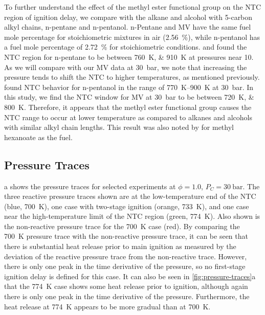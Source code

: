 \documentclass[letterpaper, review, sort&compress]{elsarticle}
\providecommand{\DIFadd}[1]{{\protect\color{blue}\uwave{#1}}} %
\providecommand{\DIFaddbegin}{} %
\providecommand{\DIFaddend}{} %
\newcommand{\DIFaddincludegraphics}[2][]{{\color{blue}\fbox{\DIFOincludegraphics[#1]{#2}}}} %
\DeclareRobustCommand{\DIFaddbegin}{\DIFOaddbegin \let\includegraphics\DIFaddincludegraphics} %
\DeclareRobustCommand{\DIFaddend}{\DIFOaddend \let\includegraphics\DIFOincludegraphics} %
\begin{document}
To further understand the effect of the methyl ester functional group on the NTC region of ignition
delay, we compare with the alkane and alcohol with 5-carbon alkyl chains, n-pentane and n-pentanol.
n-Pentane and MV have the same fuel mole percentage for stoichiometric mixtures in air
(\SI{2.56}{\percent}), while n-pentanol has a fuel mole percentage of \SI{2.72}{\percent} for
stoichiometric conditions. \citet{Ribaucour1998} and \citet{Bugler2015} found the NTC region for
n-pentane to be between \SIlist{760;910}{\K} at pressures near \SI{10}{\atm}. As we will compare
with our MV data at \SI{30}{\bar}, we note that increasing the pressure tends to shift the NTC to
higher temperatures, as mentioned previously\DIFaddbegin \DIFadd{~}\DIFaddend \cite{Kukkadapu2012}. \citet{Heufer2013} found NTC
behavior for n-pentanol in the range of \SIrange{770}{900}{\K} at \SI{30}{\bar}. In this study, we
find the NTC window for MV at \SI{30}{\bar} to be between \SIlist{720;800}{\K}. Therefore, it
appears that the methyl ester functional group causes the NTC range to occur at lower temperature as
compared to alkanes and alcohols with similar alkyl chain lengths. This result was also noted by
\citet{Hadj-Ali2009} for methyl hexanoate as the fuel.

\subsection{Pressure Traces}\label{sec:pressure-traces}

a shows the pressure traces for selected experiments at \(\phi=1.0\),
\(P_C =\SI[number-unit-product={\ }]{30}{\bar}\). The three reactive pressure traces shown are at
the low-temperature end of the NTC (blue, \SI{700}{\K}), one case with two-stage ignition (orange,
\SI{733}{\K}), and one case near the high-temperature limit of the NTC region (green, \SI{774}{\K}).
Also shown is the non-reactive pressure trace for the \SI{700}{\K} case (red). By comparing the
\SI{700}{\K} pressure trace with the non-reactive pressure trace, it can be seen that there is
substantial heat release prior to main ignition as measured by the deviation of the reactive
pressure trace from the non-reactive trace. However, there is only one peak in the time derivative
of the pressure, so no first-stage ignition delay is defined for this case. It can also be seen in
\cref{fig:pressure-traces}a that the \SI{774}{\K} case shows some heat release prior to ignition,
although again there is only one peak in the time derivative of the pressure. Furthermore, the heat
release at \SI{774}{\K} appears to be more gradual than at \SI{700}{\K}.
\end{document}

